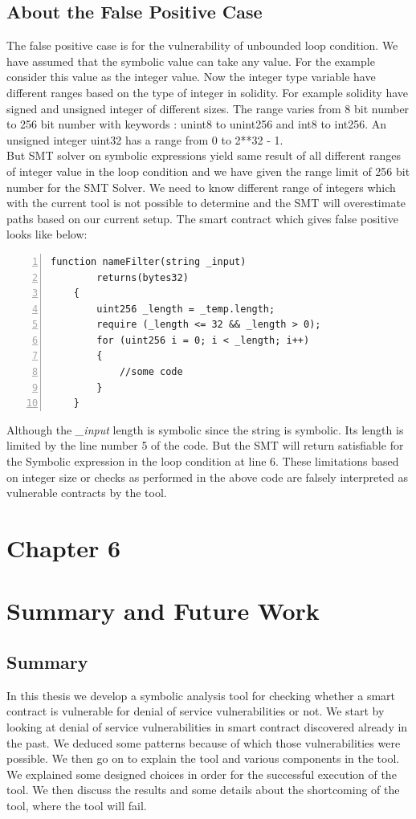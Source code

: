 \documentclass{article}
\begin{document}
\subsection*{About the False Positive Case}
The false positive case is for the vulnerability of unbounded loop condition. We have assumed that the symbolic value can take any value. For the example consider this value as the integer value. Now the integer type variable have different ranges based on the type of integer in solidity. For example solidity have signed and unsigned integer of different sizes. The range varies from 8 bit number to 256 bit number with keywords : unint8 to unint256 and int8 to int256. An unsigned integer uint32 has a range from 0 to 2**32 - 1. \\
But SMT solver on symbolic expressions yield same result of all different ranges of integer value in the loop condition and we have given the range limit of 256 bit number for the SMT Solver. We need to know different range of integers which with the current tool is not possible to determine and the SMT will overestimate paths based on our current setup. The smart contract which gives false positive looks like below:
\begin{Verbatim}[numbers=left,xleftmargin=5mm]
    function nameFilter(string _input)
        returns(bytes32)
    {
        uint256 _length = _temp.length;
        require (_length <= 32 && _length > 0);
        for (uint256 i = 0; i < _length; i++)
        {
            //some code
        }
    }
\end{Verbatim}
Although the \emph{\_input} length is symbolic since the string is symbolic. Its length is limited by the line number 5 of the code. But the SMT will return satisfiable for the Symbolic expression in the loop condition at line 6. These limitations based on integer size or checks as performed in the above code are falsely interpreted as vulnerable contracts by the tool.

\newpage
\section*{Chapter 6}
\section*{Summary and Future Work}
\subsection*{Summary}
In this thesis we develop a symbolic analysis tool for checking whether a smart contract is vulnerable for denial of service vulnerabilities or not. We start by looking at denial of service vulnerabilities in smart contract discovered already in the past. We deduced some patterns because of which those vulnerabilities were possible. We then go on to explain the tool and various components in the tool. We explained some designed choices in order for the successful execution of the tool. We then discuss the results and some details about the shortcoming of the tool, where the tool will fail. \\
\end{document}
